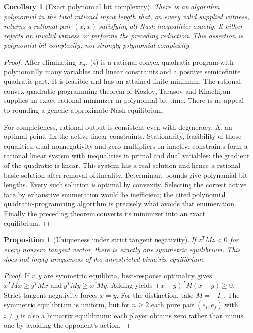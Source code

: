 \documentclass[11pt]{article}
\newtheorem{proposition}[theorem]{Proposition}
\newtheorem{corollary}[theorem]{Corollary}
\theoremstyle{remark}\newtheorem{remark}[theorem]{Remark}
\begin{document}
\begin{corollary}[Exact polynomial bit complexity]
There is an algorithm polynomial in the total rational input length that, on every valid supplied witness, returns a rational pair $(x,x)$ satisfying all Nash inequalities exactly. It either rejects an invalid witness or performs the preceding reduction. This assertion is polynomial bit complexity, not strongly polynomial complexity.
\end{corollary}
\begin{proof}
After eliminating $x_n$, (4) is a rational convex quadratic program with polynomially many variables and linear constraints and a positive semidefinite quadratic part. It is feasible and has an attained finite minimum. The rational convex quadratic programming theorem of Kozlov, Tarasov and Khachiyan \cite{qp} supplies an exact rational minimizer in polynomial bit time. There is no appeal to rounding a generic approximate Nash equilibrium.

For completeness, rational output is consistent even with degeneracy. At an optimal point, fix the active linear constraints. Stationarity, feasibility of those equalities, dual nonnegativity and zero multipliers on inactive constraints form a rational linear system with inequalities in primal and dual variables: the gradient of the quadratic is linear. This system has a real solution and hence a rational basic solution after removal of lineality. Determinant bounds give polynomial bit lengths. Every such solution is optimal by convexity. Selecting the correct active face by exhaustive enumeration would be inefficient; the cited polynomial quadratic-programming algorithm is precisely what avoids that enumeration. Finally the preceding theorem converts its minimizer into an exact equilibrium.
\end{proof}

\begin{proposition}[Uniqueness under strict tangent negativity]
If $z^TMz<0$ for every nonzero tangent vector, there is exactly one symmetric equilibrium. This does not imply uniqueness of the unrestricted bimatrix equilibrium.
\end{proposition}
\begin{proof}
If $x,y$ are symmetric equilibria, best-response optimality gives $x^TMx\ge y^TMx$ and $y^TMy\ge x^TMy$. Adding yields $(x-y)^TM(x-y)\ge0$. Strict tangent negativity forces $x=y$. For the distinction, take $M=-I_n$. The symmetric equilibrium is uniform, but for $n\ge2$ each pure pair $(e_i,e_j)$ with $i\ne j$ is also a bimatrix equilibrium: each player obtains zero rather than minus one by avoiding the opponent's action.
\end{proof}
\end{document}
